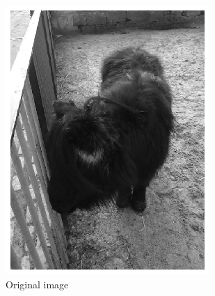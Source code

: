 \documentclass{l4proj}
\begin{document}
\begin{figure}[ht]
  \centering
  \begin{subfigure}[h!]{0.22\textwidth}
    \includegraphics[width=\textwidth]{images/autoencoder/train/gray.png}
    \caption{Original image}
  \end{subfigure}
  \begin{subfigure}[h!]{0.22\textwidth}

\end{subfigure}
\end{figure}
\end{document}
